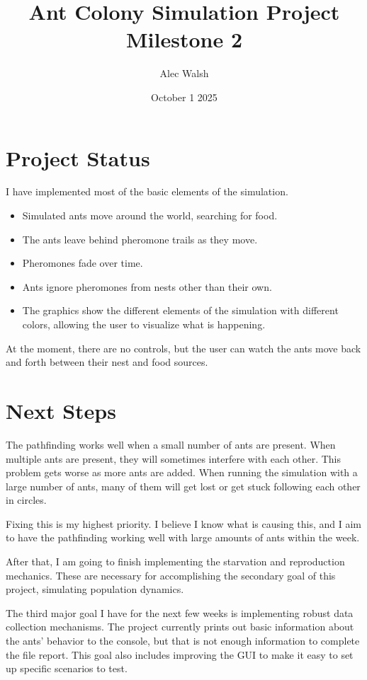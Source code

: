 \documentclass{article}
\title{Ant Colony Simulation Project Milestone 2}
\author{Alec Walsh}
\date{October 1 2025}
\begin{document}
\maketitle

\section{Project Status}

I have implemented most of the basic elements of the simulation.

\begin{itemize}

\item Simulated ants move around the world, searching for food.
\item The ants leave behind pheromone trails as they move.
\item Pheromones fade over time.
\item Ants ignore pheromones from nests other than their own.
\item The graphics show the different elements of the simulation with different colors, allowing the user to visualize what is happening.

\end{itemize}

At the moment, there are no controls, but the user can watch the ants move back and forth between their nest and food sources.

\section{Next Steps}

The pathfinding works well when a small number of ants are present.  When multiple ants are present, they will sometimes interfere with each other.  This problem gets worse as more ants are added.  When running the simulation with a large number of ants, many of them will get lost or get stuck following each other in circles.

Fixing this is my highest priority.  I believe I know what is causing this, and I aim to have the pathfinding working well with large amounts of ants within the week.

After that, I am going to finish implementing the starvation and reproduction mechanics.  These are necessary for accomplishing the secondary goal of this project, simulating population dynamics.

The third major goal I have for the next few weeks is implementing robust data collection mechanisms.  The project currently prints out basic information about the ants' behavior to the console, but that is not enough information to complete the file report.  This goal also includes improving the GUI to make it easy to set up specific scenarios to test.
\end{document}
